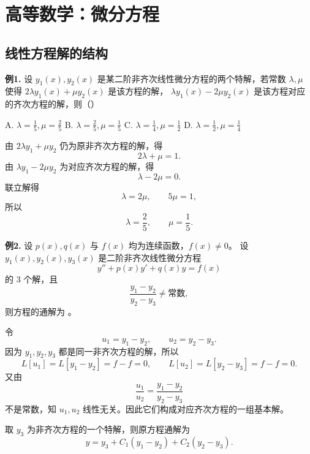 \chapter{高等数学：微分方程}

\section{线性方程解的结构}

\begin{problemblock}
\textbf{例1.} 设 \(y_1(x),y_2(x)\) 是某二阶非齐次线性微分方程的两个特解，若常数
\(\lambda,\mu\) 使得 \(2\lambda y_1(x)+\mu y_2(x)\) 是该方程的解，
\(\lambda y_1(x)-2\mu y_2(x)\) 是该方程对应的齐次方程的解，则（\quad）

A. \(\lambda=\frac15,\mu=\frac25\)
\quad B. \(\lambda=\frac25,\mu=\frac15\)
\quad C. \(\lambda=\frac14,\mu=\frac12\)
\quad D. \(\lambda=\frac12,\mu=\frac14\)
\end{problemblock}
\begin{solutionblock}
由 \(2\lambda y_1+\mu y_2\) 仍为原非齐次方程的解，得
\[
2\lambda+\mu=1.
\]
由 \(\lambda y_1-2\mu y_2\) 为对应齐次方程的解，得
\[
\lambda-2\mu=0.
\]
联立解得
\[
\lambda=2\mu,\qquad 5\mu=1,
\]
所以
\[
\lambda=\frac25,\qquad \mu=\frac15.
\]
\end{solutionblock}

\begin{problemblock}
\textbf{例2.} 设 \(p(x),q(x)\) 与 \(f(x)\) 均为连续函数，\(f(x)\ne0\)。
设 \(y_1(x),y_2(x),y_3(x)\) 是二阶非齐次线性微分方程
\[
y''+p(x)y'+q(x)y=f(x)
\]
的 3 个解，且
\[
\frac{y_1-y_2}{y_2-y_3}\ne \text{常数},
\]
则方程的通解为 \underline{\hspace{5cm}}。
\end{problemblock}
\begin{solutionblock}
令
\[
u_1=y_1-y_2,\qquad u_2=y_2-y_3.
\]
因为 \(y_1,y_2,y_3\) 都是同一非齐次方程的解，所以
\[
L[u_1]=L[y_1-y_2]=f-f=0,\qquad
L[u_2]=L[y_2-y_3]=f-f=0.
\]
又由
\[
\frac{u_1}{u_2}=\frac{y_1-y_2}{y_2-y_3}
\]
不是常数，知 \(u_1,u_2\) 线性无关。因此它们构成对应齐次方程的一组基本解。

取 \(y_3\) 为非齐次方程的一个特解，则原方程通解为
\[
y=y_3+C_1(y_1-y_2)+C_2(y_2-y_3).
\]
\end{solutionblock}

